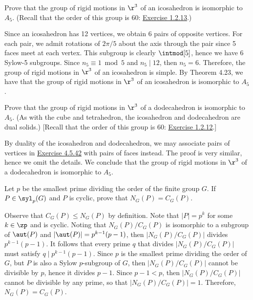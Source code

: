 \begin{exercise}\label{ex4.5.42}
	Prove that the group of rigid motions in $\r^3$ of an icosahedron is isomorphic to $A_5$. (Recall that the order of this group is 60: \hyperref[ex1.2.13]{Exercise 1.2.13}.)
\end{exercise}

\begin{sol}
	Since an icosahedron has 12 vertices, we obtain 6 pairs of opposite vertices. For each pair, we admit rotations of $2\pi/5$ about the axis through the pair since 5 faces meet at each vertex. This subgroup is clearly $\intmod[5]$, hence we have 6 Sylow-5 subgroups. Since $n_5 \equiv 1 \bmod 5$ and $n_5 \mid 12$, then $n_5 = 6$. Therefore, the group of rigid motions in $\r^3$ of an icosahedron is simple. By Theorem 4.23, we have that the group of rigid motions in $\r^3$ of an icosahedron is isomorphic to $A_5$.
\end{sol}

\begin{exercise}\label{ex4.5.43}
	Prove that the group of rigid motions in $\r^3$ of a dodecahedron is isomorphic to $A_5$. (As with the cube and tetrahedron, the icosahedron and dodecahedron are dual solids.) [Recall that the order of this group is 60: \hyperref[ex1.2.12]{Exercise 1.2.12}.]
\end{exercise}

\begin{sol}
	By duality of the icosahedron and dodecahedron, we may associate pairs of vertices in \hyperref[ex4.5.42]{Exercise 4.5.42} with pairs of faces instead. The proof is very similar, hence we omit the details. We conclude that the group of rigid motions in $\r^3$ of a dodecahedron is isomorphic to $A_5$.
\end{sol}

\newpage

\begin{exercise}\label{ex4.5.44}
	Let $p$ be the smallest prime dividing the order of the finite group $G$. If $P \in \syl_p(G)$ and $P$ is cyclic, prove that $N_G(P) = C_G(P)$.
\end{exercise}

\begin{sol}
	Observe that $C_G(P) \leq N_G(P)$ by definition. Note that $|P| = p^k$ for some $k \in \zp$ and is cyclic. Noting that $N_G(P)/C_G(P)$ is isomorphic to a subgroup of $\aut(P)$ and $|\aut(P)| = p^{k - 1}(p - 1)$, then $|N_G(P)/C_G(P)|$ divides $p^{k - 1}(p - 1)$. It follows that every prime $q$ that divides $|N_G(P)/C_G(P)|$ must satisfy $q \mid p^{k - 1}(p - 1)$. Since $p$ is the smallest prime dividing the order of $G$, but $P$ is also a Sylow $p$-subgroup of $G$, then $|N_G(P)/C_G(P)|$ cannot be divisible by $p$, hence it divides $p - 1$. Since $p - 1 < p$, then $|N_G(P)/C_G(P)|$ cannot be divisible by any prime, so that $|N_G(P)/C_G(P)| = 1$. Therefore, $N_G(P) = C_G(P)$.
\end{sol}


